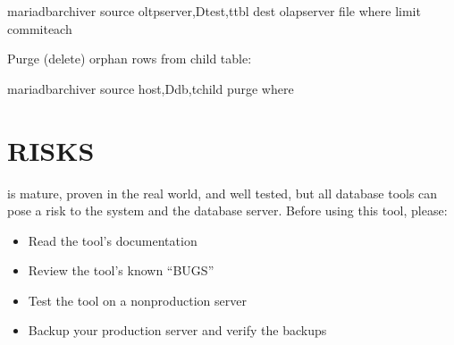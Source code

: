 \documentclass[letterpaper,10pt,english]{sphinxmanual}
\begin{document}
\begin{sphinxVerbatim}[commandchars=\\\{\}]
mariadb\PYGZhy{}archiver \PYGZhy{}\PYGZhy{}source oltp\PYGZus{}server,Dtest,ttbl \PYGZhy{}\PYGZhy{}dest olap\PYGZus{}server 
  \PYGZhy{}\PYGZhy{}file                            
  \PYGZhy{}\PYGZhy{}where  \PYGZhy{}\PYGZhy{}limit  \PYGZhy{}\PYGZhy{}commit\PYGZhy{}each
\end{sphinxVerbatim}

\sphinxAtStartPar
Purge (delete) orphan rows from child table:

\begin{sphinxVerbatim}[commandchars=\\\{\}]
mariadb\PYGZhy{}archiver \PYGZhy{}\PYGZhy{}source host,Ddb,tchild \PYGZhy{}\PYGZhy{}purge 
  \PYGZhy{}\PYGZhy{}where 
\end{sphinxVerbatim}


\section{RISKS}
\label{\detokenize{mariadb-archiver:risks}}
\sphinxAtStartPar
{} is mature, proven in the real world, and well tested,
but all database tools can pose a risk to the system and the database
server.  Before using this tool, please:
\begin{itemize}
\item {} 
\sphinxAtStartPar
Read the tool’s documentation

\item {} 
\sphinxAtStartPar
Review the tool’s known “BUGS”

\item {} 
\sphinxAtStartPar
Test the tool on a non\sphinxhyphen{}production server

\item {} 
\sphinxAtStartPar
Backup your production server and verify the backups

\end{itemize}
\end{document}
